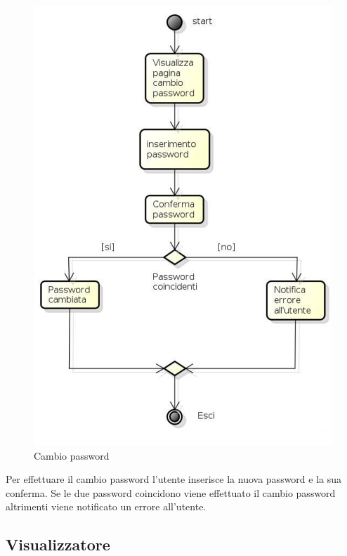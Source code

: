 \begin{figure}[h!]
		\centering
		\includegraphics[scale=.5]{img/Cambio_password.jpg}
		\caption{Cambio password}
		\label{fig:Cambio_password}
\end{figure}

Per effettuare il cambio password l'utente inserisce la nuova password e la sua conferma. Se le due password coincidono viene effettuato il cambio password altrimenti viene notificato un errore all'utente.

\newpage

\subsection{Visualizzatore}

